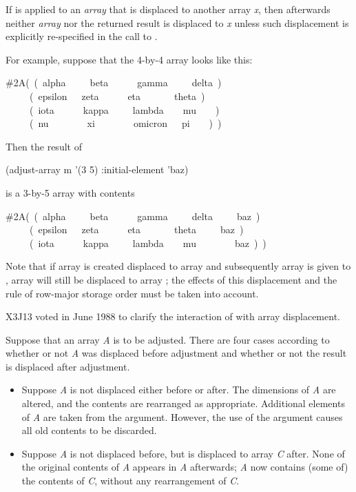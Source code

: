 \begin{defun}[Function]
If  is applied to an \emph{array} that is displaced
to another array \emph{x}, then afterwards neither \emph{array} nor the returned
result is displaced to \emph{x} unless such displacement is explicitly
re-specified in the call to .

For example, suppose that the 4-by-4 array  looks like this:
\begin{lisp}
\#2A(~(~alpha~~~~~beta~~~~~~gamma~~~~~delta~) \\
~~~~~(~epsilon~~~zeta~~~~~~eta~~~~~~~theta~) \\
~~~~~(~iota~~~~~~kappa~~~~~lambda~~~~mu~~~~) \\
~~~~~(~nu~~~~~~~~xi~~~~~~~~omicron~~~pi~~~~)~)
\end{lisp}
Then the result of
\begin{lisp}
(adjust-array m '(3 5) :initial-element 'baz)
\end{lisp}
is a 3-by-5 array with contents
\begin{lisp}
\#2A(~(~alpha~~~~~beta~~~~~~gamma~~~~~delta~~~~~baz~) \\
~~~~~(~epsilon~~~zeta~~~~~~eta~~~~~~~theta~~~~~baz~) \\
~~~~~(~iota~~~~~~kappa~~~~~lambda~~~~mu~~~~~~~~baz~)~)
\end{lisp}
Note that if array  is created displaced to array  and subsequently
array  is given to , array  will still be
displaced to array ; the effects of this displacement and
the rule of row-major storage order must be taken into account.

\begin{newer}
X3J13 voted in June 1988 
to clarify the interaction of  with array displacement.

Suppose that an array \emph{A} is to be adjusted.  There are four cases
according to whether or not \emph{A} was displaced before adjustment
and whether or not the result is displaced after adjustment.
\begin{itemize}
\item
Suppose \emph{A} is not displaced either before or after.
The dimensions of \emph{A} are altered, and
the contents are rearranged as appropriate.  Additional elements of \emph{A}
are taken from the  argument.
However, the use of the  argument causes all old
contents to be discarded.

\item
Suppose \emph{A} is not displaced before, but is displaced to array \emph{C} after.
None of the original contents of \emph{A} appears in \emph{A} afterwards; \emph{A}
now contains (some of) the contents of \emph{C}, without any rearrangement of
\emph{C}.


\end{itemize}
\end{newer}
\end{defun}
